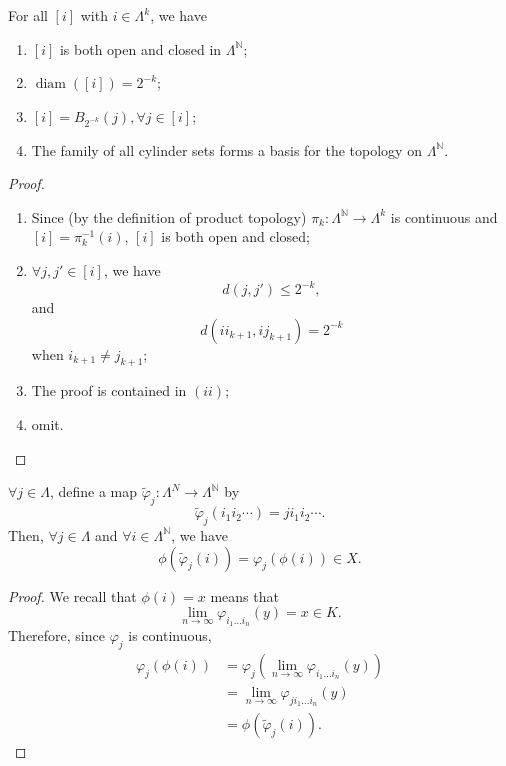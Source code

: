 \begin{lemma}\label{lem:2.6}
For all $[i]$ with $i \in \Lambda ^{k}$, we have
\begin{enumerate}[label=(\roman*)]
    \item $[i]$ is both open and closed in $\Lambda ^{\mathbb{N}}$;
    \item $\operatorname{diam}([i])=2^{-k}$;
    \item $[i]=B_{2^{-k}}(j),\forall j\in [i]$;
    \item The family of all cylinder sets forms a basis for the topology on $\Lambda ^{\mathbb{N}}$.
\end{enumerate}
\end{lemma}

\begin{proof}
\begin{enumerate}[label=(\roman*)]
    \item Since (by the definition of product topology) $\pi _{k}:\Lambda ^{\mathbb{N}}\to \Lambda ^{k}$ is continuous and $[i]=\pi _{k}^{-1}(i)$, $[i]$ is both open and closed;
    \item $\forall j,j' \in[i]$, we have \[d(j,j')\leq 2^{-k},\]and \[d(i i_{k+1},ij_{k+1})=2^{-k}\]when $i_{k+1}\neq j_{k+1}$;
    \item The proof is contained in $(ii)$;
    \item omit.\qedhere
\end{enumerate}
\end{proof}

\begin{lemma}\label{lem:2.7}
$\forall j \in \Lambda$, define a map $\tilde{\varphi}_{j}:\Lambda ^{N}\to \Lambda ^{\mathbb{N}}$ by
\[
\tilde{\varphi}_{j}(i_{1}i_{2}\cdots)=ji_{1}i_{2}\cdots .
\]
Then, $\forall j \in \Lambda$ and $\forall i \in \Lambda ^{\mathbb{N}}$, we have
\[
\phi(\tilde{\varphi}_{j}(i))=\varphi _{j}(\phi(i)) \in X.
\]
\end{lemma}

\begin{proof}
We recall that $\phi(i)=x$ means that
\[
\lim_{ n \to \infty } \varphi _{i_{1}\dots i_{n}}(y)=x \in K.
\]
Therefore, since $\varphi _{j}$ is continuous,
\begin{align*}
\varphi _{j}(\phi(i)) & =\varphi _{j}(\lim_{ n \to \infty } \varphi _{i_{1}\dots i_{n}}(y)) \\
 & =\lim_{ n \to \infty } \varphi _{ji_{1}\dots i_{n}}(y) \\
 & =\phi(\tilde{\varphi}_{j}(i)).
\end{align*}
\end{proof}

